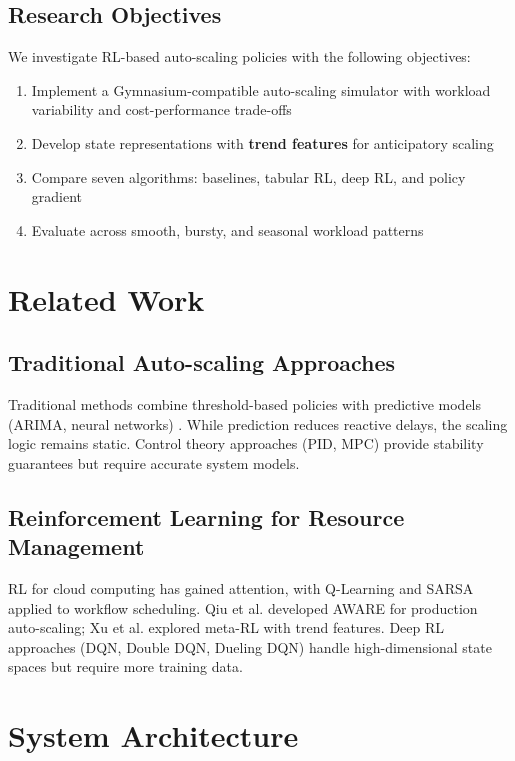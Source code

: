 \documentclass[conference]{IEEEtran}
\begin{document}
\subsection{Research Objectives}
We investigate RL-based auto-scaling policies with the following objectives:
\begin{enumerate}
    \item Implement a Gymnasium-compatible auto-scaling simulator with workload variability and cost-performance trade-offs
    \item Develop state representations with \textbf{trend features} for anticipatory scaling \cite{xu2022}
    \item Compare seven algorithms: baselines, tabular RL, deep RL, and policy gradient
    \item Evaluate across smooth, bursty, and seasonal workload patterns
\end{enumerate}

\section{Related Work}

\subsection{Traditional Auto-scaling Approaches}
Traditional methods combine threshold-based policies with predictive models (ARIMA, neural networks) \cite{garcia2020}. While prediction reduces reactive delays, the scaling logic remains static. Control theory approaches (PID, MPC) provide stability guarantees but require accurate system models.

\subsection{Reinforcement Learning for Resource Management}
RL for cloud computing has gained attention, with Q-Learning and SARSA applied to workflow scheduling. Qiu et al. \cite{qiu2023} developed AWARE for production auto-scaling; Xu et al. \cite{xu2022} explored meta-RL with trend features. Deep RL approaches (DQN, Double DQN, Dueling DQN) \cite{mnih2015,hasselt2016,wang2016} handle high-dimensional state spaces but require more training data.

\section{System Architecture}
\end{document}
